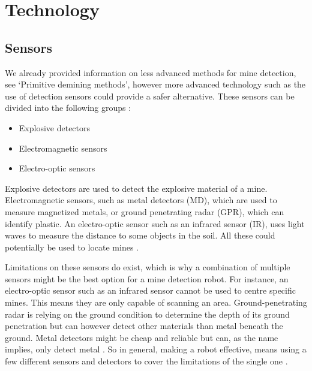 \chapter{Technology}

\section{Sensors}

We already provided information on less advanced methods for mine detection, see ‘Primitive demining methods’, however more advanced technology such as the use of detection sensors could provide a safer alternative. These sensors can be divided into the following groups \cite{HumanitarianDemining2017}:
\begin{itemize}
\setlength{\itemsep}{0.05\baselineskip}
	\item Explosive detectors
	\item Electromagnetic sensors
	\item Electro-optic sensors
\end{itemize}

Explosive detectors are used to detect the explosive material of a mine. Electromagnetic sensors, such as metal detectors (MD), which are used to measure magnetized metals, or ground penetrating radar (GPR), which can identify plastic. An electro-optic sensor such as an infrared sensor (IR), uses light waves to measure the distance to some objects in the soil. All these could potentially be used to locate mines \cite{HumanitarianDemining2017}.

Limitations on these sensors do exist, which is why a combination of multiple sensors might be the best option for a mine detection robot. For instance, an electro-optic sensor such as an infrared sensor cannot be used to centre specific mines. This means they are only capable of scanning an area. Ground-penetrating radar is relying on the ground condition to determine the depth of its ground penetration but can however detect other materials than metal beneath the ground. Metal detectors might be cheap and reliable but can, as the name implies, only detect metal \cite{HumanitarianDemining2017}.
So in general, making a robot effective, means using a few different sensors and detectors to cover the limitations of the single one \cite{6LeggedRobot2007}.



